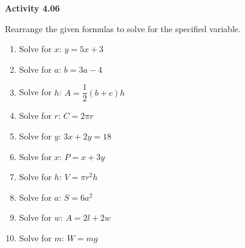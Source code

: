 \vspace{0.3ex}
\noindent\textbf{Activity 4.06}

\vspace{0.2ex}

Rearrange the given formulas to solve for the specified variable. 

\begin{multicols}{2}				
\begin{enumerate}
    \item Solve for \(x\): \(y = 5x + 3\)  
    \item Solve for \(a\): \(b = 3a - 4\)  
    \item Solve for \(h\): \(A = \dfrac{1}{2} (b + c) h\)  
    \item Solve for \(r\): \(C = 2\pi r\)  
    \item Solve for \(y\): \(3x + 2y = 18\)  
    \item Solve for \(x\): \(P = x + 3y\)  
    \item Solve for \(h\): \(V = \pi r^2 h\)  
    \item Solve for \(a\): \(S = 6a^2\)  
    \item Solve for \(w\): \(A = 2l + 2w\)  
    \item Solve for \(m\): \(W = mg\)  
\end{enumerate}
\end{multicols}
